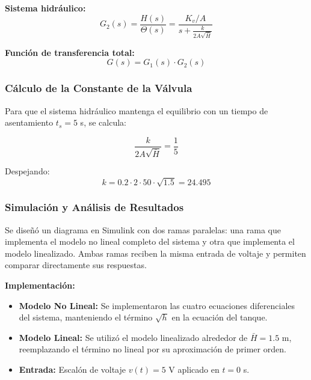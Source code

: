\documentclass[conference]{IEEEtran}
\begin{document}
\textbf{Sistema hidráulico:}
\begin{equation}
G_2(s) = \frac{H(s)}{\Theta(s)} = \frac{K_v/A}{s + \frac{k}{2A\sqrt{\bar{H}}}}
\end{equation}

\textbf{Función de transferencia total:}
\begin{equation}
G(s) = G_1(s) \cdot G_2(s)
\end{equation}

\subsubsection{Cálculo de la Constante de la Válvula}

Para que el sistema hidráulico mantenga el equilibrio con un tiempo de asentamiento $t_s = 5$ s, se calcula:

\begin{equation}
\frac{k}{2A\sqrt{\bar{H}}} = \frac{1}{5}
\end{equation}

Despejando:
\begin{equation}
k = 0.2 \cdot 2 \cdot 50 \cdot \sqrt{1.5} = 24.495
\end{equation}

\subsubsection{Simulación y Análisis de Resultados}

Se diseñó un diagrama en Simulink con dos ramas paralelas: una rama que implementa el modelo no lineal completo del sistema y otra que implementa el modelo linealizado. Ambas ramas reciben la misma entrada de voltaje y permiten comparar directamente sus respuestas.

\textbf{Implementación:}
\begin{itemize}
\item \textbf{Modelo No Lineal:} Se implementaron las cuatro ecuaciones diferenciales del sistema, manteniendo el término $\sqrt{h}$ en la ecuación del tanque.
\item \textbf{Modelo Lineal:} Se utilizó el modelo linealizado alrededor de $\bar{H} = 1.5$ m, reemplazando el término no lineal por su aproximación de primer orden.
\item \textbf{Entrada:} Escalón de voltaje $v(t) = 5$ V aplicado en $t = 0$ s.
\end{itemize}
\end{document}
